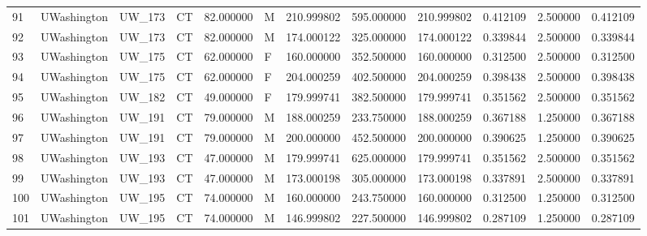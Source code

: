 \begin{tabular}{llllrlrrrrrr}
91     &     UWashington &       UW\_173 &                 CT &  82.000000 &        M &       210.999802 &    595.000000 &  210.999802 &               0.412109 &            2.500000 &          0.412109 \\
92     &     UWashington &       UW\_173 &                 CT &  82.000000 &        M &       174.000122 &    325.000000 &  174.000122 &               0.339844 &            2.500000 &          0.339844 \\
93     &     UWashington &       UW\_175 &                 CT &  62.000000 &        F &       160.000000 &    352.500000 &  160.000000 &               0.312500 &            2.500000 &          0.312500 \\
94     &     UWashington &       UW\_175 &                 CT &  62.000000 &        F &       204.000259 &    402.500000 &  204.000259 &               0.398438 &            2.500000 &          0.398438 \\
95     &     UWashington &       UW\_182 &                 CT &  49.000000 &        F &       179.999741 &    382.500000 &  179.999741 &               0.351562 &            2.500000 &          0.351562 \\
96     &     UWashington &       UW\_191 &                 CT &  79.000000 &        M &       188.000259 &    233.750000 &  188.000259 &               0.367188 &            1.250000 &          0.367188 \\
97     &     UWashington &       UW\_191 &                 CT &  79.000000 &        M &       200.000000 &    452.500000 &  200.000000 &               0.390625 &            1.250000 &          0.390625 \\
98     &     UWashington &       UW\_193 &                 CT &  47.000000 &        M &       179.999741 &    625.000000 &  179.999741 &               0.351562 &            2.500000 &          0.351562 \\
99     &     UWashington &       UW\_193 &                 CT &  47.000000 &        M &       173.000198 &    305.000000 &  173.000198 &               0.337891 &            2.500000 &          0.337891 \\
100    &     UWashington &       UW\_195 &                 CT &  74.000000 &        M &       160.000000 &    243.750000 &  160.000000 &               0.312500 &            1.250000 &          0.312500 \\
101    &     UWashington &       UW\_195 &                 CT &  74.000000 &        M &       146.999802 &    227.500000 &  146.999802 &               0.287109 &            1.250000 &          0.287109 \\

\end{tabular}
